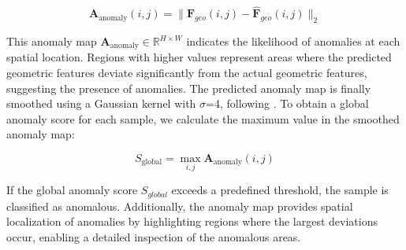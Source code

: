\begin{equation}
\mathbf{A}_{\text{anomaly}}(i, j) = \|\mathbf{F}_{geo}(i, j) - \hat{\mathbf{F}}_{geo}(i, j)\|_2
\end{equation}

\noindent This anomaly map $\mathbf{A}_{\text{anomaly}} \in \mathbb{R}^{H \times W}$ indicates the likelihood of anomalies at each spatial location. Regions with higher values represent areas where the predicted geometric features deviate significantly from the actual geometric features, suggesting the presence of anomalies. The predicted anomaly map is finally smoothed using a Gaussian kernel with $\sigma$=4, following \cite{roth2022towards}. To obtain a global anomaly score for each sample, we calculate the maximum value in the smoothed anomaly map:

\begin{equation}
S_{\text{global}} = \max_{i,j} \mathbf{A}_{\text{anomaly}}(i, j)
\end{equation}

\noindent If the global anomaly score $S_{global}$ exceeds a predefined threshold, the sample is classified as anomalous. Additionally, the anomaly map provides spatial localization of anomalies by highlighting regions where the largest deviations occur, enabling a detailed inspection of the anomalous areas. 
